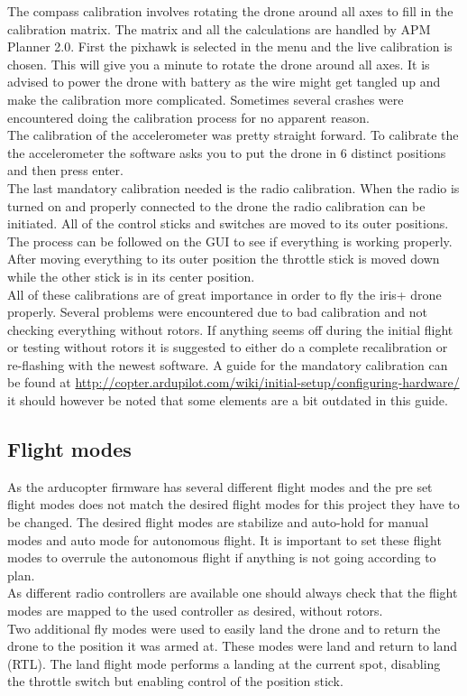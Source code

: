 The compass calibration involves rotating the drone around all axes to fill in the calibration
matrix. The matrix and all the calculations are handled by APM Planner 2.0. First the pixhawk is
selected in the menu and the live calibration is chosen. This will give you a minute to rotate the
drone around all axes. It is advised to power the drone with battery as the wire might get tangled
up and make the calibration more complicated. Sometimes several crashes were encountered doing the
calibration process for no apparent reason.\\

The calibration of the accelerometer was pretty straight forward. To calibrate the the accelerometer
the software asks you to put the drone in 6 distinct positions and then press enter.\\

The last mandatory calibration needed is the radio calibration. When the radio is turned on and
properly connected to the drone the radio calibration can be initiated. All of the control sticks
and switches are moved to its outer positions. The process can be followed on the GUI to see if
everything is working properly. After moving everything to its outer position the throttle stick is
moved down while the other stick is in its center position.\\

All of these calibrations are of great importance in order to fly the iris+ drone properly. Several
problems were encountered due to bad calibration and not checking everything without rotors. If
anything seems off during the initial flight or testing without rotors it is suggested to either do
a complete recalibration or re-flashing with the newest software. A guide for the mandatory
calibration can be found at
\url{http://copter.ardupilot.com/wiki/initial-setup/configuring-hardware/} it should however be
noted that some elements are a bit outdated in this guide.

\subsection*{Flight modes}
As the arducopter firmware has several different flight modes and the pre set flight modes does not
match the desired flight modes for this project they have to be changed. The desired flight modes
are stabilize and auto-hold for manual modes and auto mode for autonomous flight. It is important to
set these flight modes to overrule the autonomous flight if anything is not going according to
plan.\\
As different radio controllers are available one should always check that the flight modes are
mapped to the used controller as desired, without rotors.\\
Two additional fly modes were used to easily land the drone and to return the drone to the position
it was armed at. These modes were land and return to land (RTL). The land flight mode performs a
landing at the current spot, disabling the throttle switch but enabling control of the position
stick.\\

